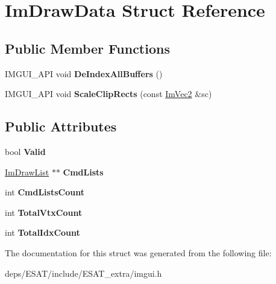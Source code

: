 \hypertarget{struct_im_draw_data}{}\section{Im\+Draw\+Data Struct Reference}
\label{struct_im_draw_data}
\subsection*{Public Member Functions}
\begin{DoxyCompactItemize}
\item 
\mbox{\label{struct_im_draw_data_af75033bfd13b36910487af2f28e0c912}} 
I\+M\+G\+U\+I\+\_\+\+A\+PI void {\bfseries De\+Index\+All\+Buffers} ()
\item 
\mbox{\label{struct_im_draw_data_af162d01f17a909f6b9c07001282682ed}} 
I\+M\+G\+U\+I\+\_\+\+A\+PI void {\bfseries Scale\+Clip\+Rects} (const \mbox{\hyperlink{struct_im_vec2}{Im\+Vec2}} \&sc)
\end{DoxyCompactItemize}
\subsection*{Public Attributes}
\begin{DoxyCompactItemize}
\item 
\mbox{\label{struct_im_draw_data_ad01ab9ce5e8843b7860ccbb3eb9a6554}} 
bool {\bfseries Valid}
\item 
\mbox{\label{struct_im_draw_data_a9e93fe7e620eb2e9f61e3b689d617edc}} 
\mbox{\hyperlink{struct_im_draw_list}{Im\+Draw\+List}} $\ast$$\ast$ {\bfseries Cmd\+Lists}
\item 
\mbox{\label{struct_im_draw_data_adc0bbc2881c15f78bdabe51d82582f4e}} 
int {\bfseries Cmd\+Lists\+Count}
\item 
\mbox{\label{struct_im_draw_data_af0035b52cdf91932b25eaf2da853965a}} 
int {\bfseries Total\+Vtx\+Count}
\item 
\mbox{\label{struct_im_draw_data_a1ac8a5d441f464628295ef91a0602fc5}} 
int {\bfseries Total\+Idx\+Count}
\end{DoxyCompactItemize}


The documentation for this struct was generated from the following file\+:\begin{DoxyCompactItemize}
\item 
deps/\+E\+S\+A\+T/include/\+E\+S\+A\+T\+\_\+extra/imgui.\+h\end{DoxyCompactItemize}
